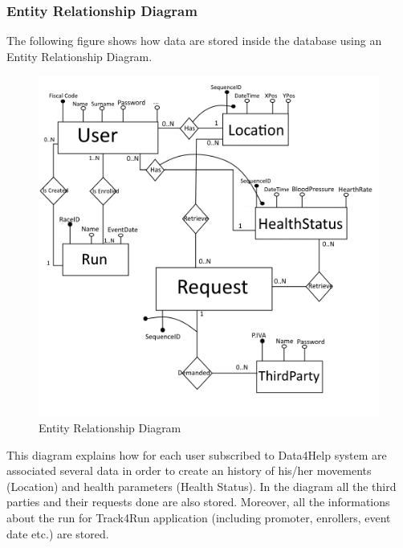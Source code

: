 \clearpage

\subsubsection{Entity Relationship Diagram}
The following figure shows how data are stored inside the database using an Entity Relationship Diagram.
\begin{figure}[H]
\centering
\includegraphics[scale=0.65]{Images/ERDiagram.png}
\caption{Entity Relationship Diagram}
\end{figure}
\noindent
This diagram explains how for each user subscribed to Data4Help system are associated several data in order to create an history of his/her movements (Location) and health parameters (Health Status). In the diagram all the third parties and their requests done are also stored. Moreover, all the informations about the run for Track4Run application (including promoter, enrollers, event date etc.) are stored.

\newpage
